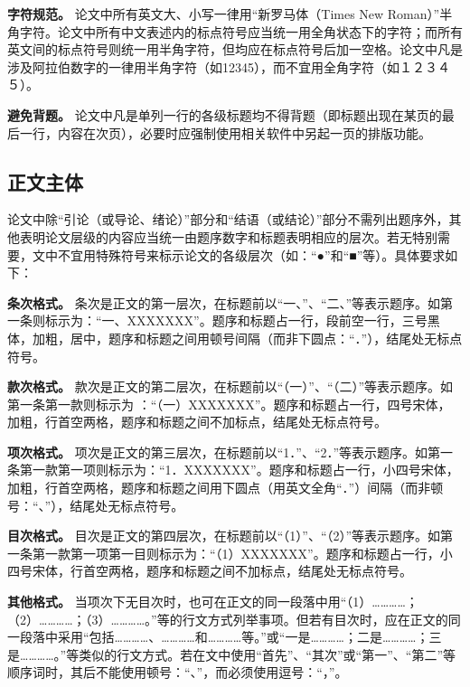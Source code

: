 \documentclass[doublesided]{Style/ucasthesis}%
\begin{document}
\textbf{字符规范。} 论文中所有英文大、小写一律用``新罗马体（Times New Roman）''半角字符。论文中所有中文表述内的标点符号应当统一用全角状态下的字符；而所有英文间的标点符号则统一用半角字符，但均应在标点符号后加一空格。论文中凡是涉及阿拉伯数字的一律用半角字符（如12345），而不宜用全角字符（如１２３４５）。

\textbf{避免背题。} 论文中凡是单列一行的各级标题均不得背题（即标题出现在某页的最后一行，内容在次页），必要时应强制使用相关软件中另起一页的排版功能。

\hypertarget{section-25}{%
\subsection{正文主体}\label{section-25}}

论文中除``引论（或导论、绪论）''部分和``结语（或结论）''部分不需列出题序外，其他表明论文层级的内容应当统一由题序数字和标题表明相应的层次。若无特别需要，文中不宜用特殊符号来标示论文的各级层次（如：``●''和``■''等）。具体要求如下：

\textbf{条次格式。} 条次是正文的第一层次，在标题前以``一、''、``二、''等表示题序。如第一条则标示为：``一、XXXXXXX''。题序和标题占一行，段前空一行，三号黑体，加粗，居中，题序和标题之间用顿号间隔（而非下圆点：``．''），结尾处无标点符号。

\textbf{款次格式。} 款次是正文的第二层次，在标题前以``（一）''、``（二）''等表示题序。如第一条第一款则标示为 ：``（一）XXXXXXX''。题序和标题占一行，四号宋体，加粗，行首空两格，题序和标题之间不加标点，结尾处无标点符号。

\textbf{项次格式。} 项次是正文的第三层次，在标题前以``1．''、``2．''等表示题序。如第一条第一款第一项则标示为：``1．XXXXXXX''。题序和标题占一行，小四号宋体，加粗，行首空两格，题序和标题之间用下圆点（用英文全角``．''）间隔（而非顿号：``、''），结尾处无标点符号。

\textbf{目次格式。} 目次是正文的第四层次，在标题前以``（1）''、``（2）''等表示题序。如第一条第一款第一项第一目则标示为：``（1）XXXXXXX''。题序和标题占一行，小四号宋体，行首空两格，题序和标题之间不加标点，结尾处无标点符号。

\textbf{其他格式。} 当项次下无目次时，也可在正文的同一段落中用``（1）\ldots{}\ldots{}\ldots{}\ldots{}；（2）\ldots{}\ldots{}\ldots{}\ldots{}；（3）\ldots{}\ldots{}\ldots{}\ldots{}。''等的行文方式列举事项。但若有目次时，应在正文的同一段落中采用``包括\ldots{}\ldots{}\ldots{}\ldots{}、\ldots{}\ldots{}\ldots{}\ldots{}和\ldots{}\ldots{}\ldots{}\ldots{}等。''或``一是\ldots{}\ldots{}\ldots{}\ldots{}；二是\ldots{}\ldots{}\ldots{}\ldots{}；三是\ldots{}\ldots{}\ldots{}\ldots{}。''等类似的行文方式。若在文中使用``首先''、``其次''或``第一''、``第二''等顺序词时，其后不能使用顿号：``、''，而必须使用逗号：``，''。
\end{document}
